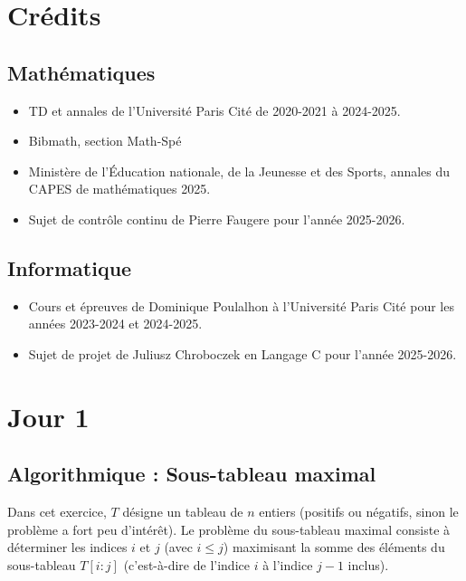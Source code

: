 \documentclass{article}
\begin{document}
\newpage

\section*{Crédits}
\subsection{Mathématiques}
\begin{itemize}
\item TD et annales de l'Université Paris Cité de 2020-2021 à 2024-2025.
\item Bibmath, section Math-Spé
\item Ministère de l'Éducation nationale, de la Jeunesse et des Sports, annales du CAPES de mathématiques 2025.
\item Sujet de contrôle continu de Pierre Faugere pour l'année 2025-2026.
\end{itemize}

\subsection{Informatique}
\begin{itemize}
\item Cours et épreuves de Dominique Poulalhon à l'Université Paris Cité pour les années 2023-2024 et 2024-2025.
\item Sujet de projet de Juliusz Chroboczek en Langage C pour l'année 2025-2026.
\end{itemize}

\tableofcontents

\newpage
\renewcommand{\arraystretch}{1.3}
\section{Jour 1}
\subsection{Algorithmique : Sous-tableau maximal}
Dans cet exercice, $T$ désigne un tableau de $n$ entiers (positifs ou négatifs, sinon le problème a fort peu d'intérêt). Le problème du sous-tableau maximal consiste à déterminer les indices $i$ et $j$ (avec $i \le j$) maximisant la somme des éléments du sous-tableau $T[i:j]$ (c'est-à-dire de l'indice $i$ à l'indice $j - 1$ inclus). 
\end{document}
